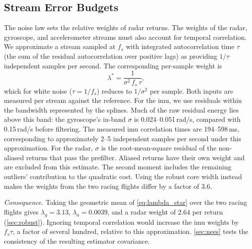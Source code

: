 \subsection{Stream Error Budgets}
\label{sec:char_budget}
The noise law sets the relative weights of radar returns.  The weights
of the radar, gyroscope, and accelerometer streams must also account
for temporal correlation.  We approximate a stream sampled at $f_s$ with integrated
autocorrelation time $\tau$ (the sum of the residual autocorrelation
over positive lags) as providing $1/\tau$ independent samples per
second.  The corresponding per-sample weight is
\begin{equation}
  \lambda^\ast = \frac{1}{\sigma^2\, f_s\, \tau},
  \label{eq:lambda_star}
\end{equation}
which for white noise ($\tau = 1/f_s$) reduces to
$1/\sigma^2$ per sample.  Both inputs are measured per stream against
the reference.  For the \ac{imu}, we use residuals within the bandwidth
represented by the splines.  Much of the raw residual energy lies above
this band: the gyroscope's in-band $\sigma$ is 0.024--0.051\,rad/s,
compared with 0.15\,rad/s before filtering.  The measured \ac{imu}
correlation times are 194--598\,ms, corresponding to approximately
2--5 independent samples per second under this approximation.
For the radar, $\sigma$ is the root-mean-square residual of the
non-aliased returns that pass the prefilter. Aliased returns have their
own weight and are excluded from this estimate.  The second moment
includes the remaining outliers' contribution to the quadratic cost.
Using the robust core width instead makes the weights from the two
racing flights differ by a factor of $3.6$.

\emph{Consequence.}  Taking the geometric mean of
\eqref{eq:lambda_star} over the two racing flights gives
$\lambda_g = 3.13$, $\lambda_a = 0.0039$, and a radar weight of $2.64$
per return (\autoref{sec:robust}).  Ignoring temporal correlation would
increase the \ac{imu} weights by $f_s\tau$, a factor of several hundred,
relative to this approximation.  \autoref{sec:nees} tests the consistency
of the resulting estimator covariance.
